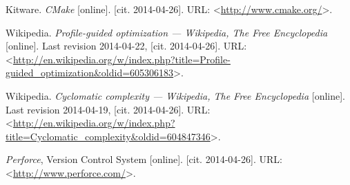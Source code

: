 \begin{thebibliography}{99}
	{\sc Kitware}.
	\emph{CMake} [online].
	[cit. 2014-04-26].
	URL: <\url{http://www.cmake.org/}>.
	
	{\sc Wikipedia}.
	\emph{Profile-guided optimization --- {W}ikipedia{,} The Free Encyclopedia} [online].
	Last revision 2014-04-22, [cit. 2014-04-26].
	URL: <\url{http://en.wikipedia.org/w/index.php?title=Profile-guided_optimization&oldid=605306183}>.	

	{\sc Wikipedia}.
	\emph{Cyclomatic complexity --- {W}ikipedia{,} The Free Encyclopedia} [online].
	Last revision 2014-04-19, [cit. 2014-04-26].
	URL: <\url{http://en.wikipedia.org/w/index.php?title=Cyclomatic_complexity&oldid=604847346}>.
	
	\emph{Perforce}, Version Control System [online].
	[cit. 2014-04-26].
	URL: <\url{http://www.perforce.com/}>.
	
\end{thebibliography}
